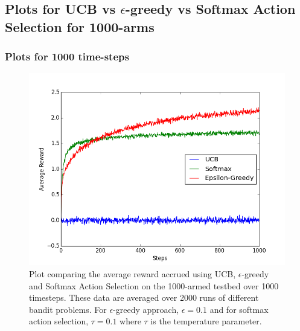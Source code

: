 \documentclass[english]{article}
\begin{document}
\subsection{Plots for UCB vs $\epsilon$-greedy vs Softmax Action Selection for 1000-arms}
\subsubsection{Plots for 1000 time-steps}
\begin{figure}[H]
  \includegraphics[width=\linewidth]{compare_ucb_1000_arms_1000_steps_average_reward.png}
  \caption{Plot comparing the average reward accrued using UCB, $\epsilon$-greedy and Softmax Action Selection on the 1000-armed testbed over 1000 timesteps. These data are averaged over 2000 runs of different bandit problems. For $\epsilon$-greedy approach, $\epsilon = 0.1 $ and for softmax action selection, $\tau = 0.1$ where $\tau$ is the temperature parameter.}
  \label{fig:eg1}
\end{figure}
\end{document}
